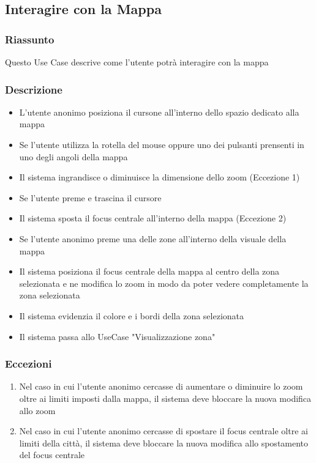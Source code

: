     \subsection{Interagire con la Mappa}
        \subsubsection{Riassunto}
            Questo Use Case descrive come l'utente potrà interagire con la mappa
        \subsubsection{Descrizione}
            \begin{itemize} 
                \item L'utente anonimo posiziona il cursone all'interno dello spazio dedicato alla mappa
                \item Se l'utente utilizza la rotella del mouse oppure uno dei pulsanti prensenti in uno degli angoli della mappa
                \item Il sistema ingrandisce o diminuisce la dimensione dello zoom (Eccezione 1)
                \item Se l'utente preme e trascina il cursore
                \item Il sistema sposta il focus centrale all'interno della mappa (Eccezione 2)
                \item Se l'utente anonimo preme una delle zone all'interno della visuale della mappa
                \item Il sistema posiziona il focus centrale della mappa al centro della zona selezionata e ne modifica lo zoom in modo da poter vedere completamente la zona selezionata
                \item Il sistema evidenzia il colore e i bordi della zona selezionata
                \item Il sistema passa allo UseCase "Visualizzazione zona"
            \end{itemize}
        \subsubsection{Eccezioni}
            \begin{enumerate}
                \item Nel caso in cui l'utente anonimo cercasse di aumentare o diminuire lo zoom oltre ai limiti imposti dalla mappa, il sistema deve bloccare la nuova modifica allo zoom
                \item Nel caso in cui l'utente anonimo cercasse di spostare il focus centrale oltre ai limiti della città, il sistema deve bloccare la nuova modifica allo spostamento del focus centrale
            \end{enumerate}
